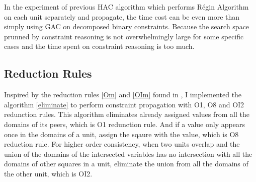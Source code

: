 \documentclass[a4paper, 12pt]{report}
\begin{document}
            In the experiment of previous HAC algorithm which performs Régin Algorithm on each unit separately and propagate, the time cost can be even more than simply using GAC on decomposed binary constraints. Because the search
            space prunned by constraint reasoning is not overwhelmingly large for some specific cases and the time spent on constraint reasoning is too much.
        \subsection{Reduction Rules}

            Inspired by the reduction rules \ref{Om} and \ref{OIm} found in \cite{lardeux2008managing,lardeux2008overlapping}, I implemented the algorithm \ref{eliminate} to perform constraint propagation with O1, O8 and OI2 redunction rules. This algorithm eliminates already assigned values from all the domains of its peers, which is O1 redunction rule. And if a value only appears once in the domains of a unit, assign the sqaure with the value, which is O8 reduction rule. For higher order consistency, when two units overlap
            and the union of the domains of the intersected variables has no intersection with all the domains of other squares in a unit, eliminate the union from all the domains of the other unit, which is OI2.
\end{document}
